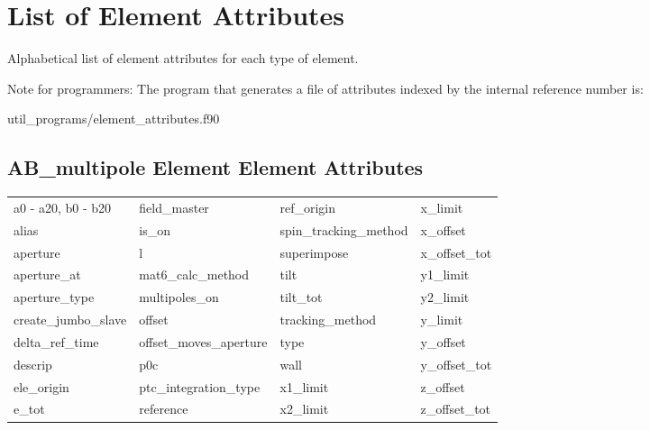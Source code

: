 \chapter{List of Element Attributes}
\label{c:attrib.list}

Alphabetical list of element attributes for each type of element. 

Note for programmers: The program that generates a file of attributes indexed by the
internal reference number is:
\begin{example}
  util_programs/element_attributes.f90 
\end{example}

 \section{AB_multipole Element Element Attributes}
 \label{s:list.ab.multipole}
 
 \begin{tabular}{llll} \toprule
a0 - a20, b0 - b20          & field_master                & ref_origin                  & x_limit                     \\
alias                       & is_on                       & spin_tracking_method        & x_offset                    \\
aperture                    & l                           & superimpose                 & x_offset_tot                \\
aperture_at                 & mat6_calc_method            & tilt                        & y1_limit                    \\
aperture_type               & multipoles_on               & tilt_tot                    & y2_limit                    \\
create_jumbo_slave          & offset                      & tracking_method             & y_limit                     \\
delta_ref_time              & offset_moves_aperture       & type                        & y_offset                    \\
descrip                     & p0c                         & wall                        & y_offset_tot                \\
ele_origin                  & ptc_integration_type        & x1_limit                    & z_offset                    \\
e_tot                       & reference                   & x2_limit                    & z_offset_tot                \\
 \bottomrule
 \end{tabular}
 \vfill
 
